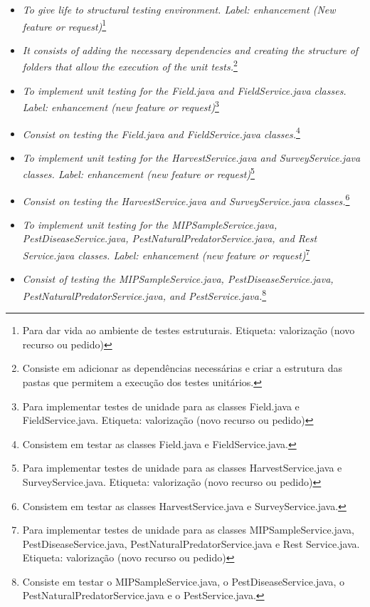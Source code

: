 \begin{itemize}
 \item[1] \textit{To give life to structural testing environment. Label: enhancement (New feature or request)}\footnote{Para dar vida ao ambiente de testes estruturais. Etiqueta: valorização (novo recurso ou pedido)}

\item \textit{It consists of adding the necessary dependencies and creating the structure of folders that allow the execution of the unit tests.}\footnote{Consiste em adicionar as dependências necessárias e criar a estrutura das pastas que permitem a execução dos testes unitários.}

 \item[2] \textit{To implement unit testing for the Field.java and FieldService.java classes. Label: enhancement (new feature or request)}\footnote{Para implementar testes de unidade para as classes Field.java e FieldService.java. Etiqueta: valorização (novo recurso ou pedido)}

\item \textit{Consist on testing the Field.java and FieldService.java classes.}\footnote{Consistem em testar as classes Field.java e FieldService.java.}

 \item[3] \textit{To implement unit testing for the HarvestService.java and SurveyService.java classes. Label: enhancement (new feature or request)}\footnote{Para implementar testes de unidade para as classes HarvestService.java e SurveyService.java. Etiqueta: valorização (novo recurso ou pedido)}

\item \textit{Consist on testing the HarvestService.java and SurveyService.java classes.}\footnote{Consistem em testar as classes HarvestService.java e SurveyService.java.}

 \item[4] \textit{To implement unit testing for the MIPSampleService.java, PestDiseaseService.java, PestNaturalPredatorService.java, and Rest Service.java classes. Label: enhancement (new feature or request)}\footnote{Para implementar testes de unidade para as classes MIPSampleService.java, PestDiseaseService.java, PestNaturalPredatorService.java e Rest Service.java. Etiqueta: valorização (novo recurso ou pedido)}

\item \textit{Consist of testing the MIPSampleService.java, PestDiseaseService.java, PestNaturalPredatorService.java, and PestService.java.}\footnote{Consiste em testar o MIPSampleService.java, o PestDiseaseService.java, o PestNaturalPredatorService.java e o PestService.java.}



\end{itemize}
